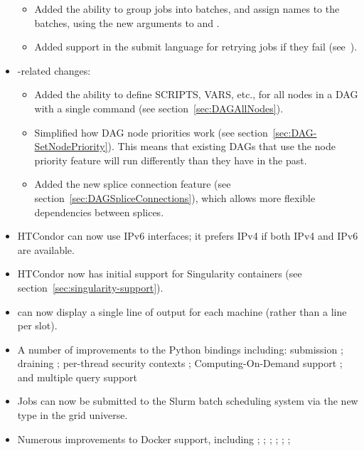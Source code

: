 \begin{itemize}
\begin{itemize}
   \item Added the ability to group jobs into batches, and assign
   names to the batches, using the new  arguments to
    and .

   \item Added support in the submit language for retrying jobs
   if they fail (see~\pageref{condor-submit-max-retries}).

  \end{itemize}

\item {}-related changes:
  \begin{itemize}

  \item Added the ability to define SCRIPTS, VARS, etc., for all nodes
  in a DAG with a single command (see section~\ref{sec:DAGAllNodes}).

  \item Simplified how DAG node priorities work
  (see section~\ref{sec:DAG-SetNodePriority}).
  This means that existing DAGs that use the node priority feature
  will run differently than they have in the past.

  \item Added the new splice connection feature
  (see section~\ref{sec:DAGSpliceConnections}), which
  allows more flexible dependencies between splices.

  \end{itemize}

\item HTCondor can now use IPv6 interfaces; it prefers IPv4 if both
IPv4 and IPv6 are available.

\item HTCondor now has initial support for Singularity containers
(see section~\ref{sec:singularity-support}).

\item {} can now display a single line of output for
each machine (rather than a line per slot).

\item A number of improvements to the Python bindings including: submission
;
draining
;
per-thread security contexts
;
Computing-On-Demand support
; and
multiple query support

\item Jobs can now be submitted to the Slurm batch scheduling system via
the new  type in the grid universe.

\item Numerous improvements to Docker support, including
;
;
;
;
;
;


\end{itemize}

